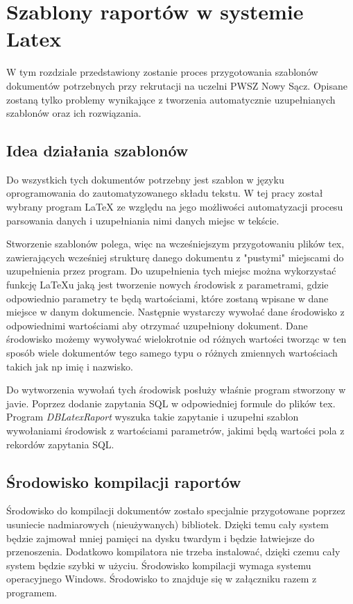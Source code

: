 \chapter{Szablony raportów w systemie Latex}
\label{ch:szablonyraportowwsystemielatex}

W tym rozdziale przedstawiony zostanie proces przygotowania szablonów dokumentów potrzebnych przy rekrutacji na uczelni PWSZ Nowy Sącz. Opisane zostaną tylko problemy wynikające z tworzenia automatycznie uzupełnianych szablonów oraz ich rozwiązania.

\section{Idea działania szablonów}

Do wszystkich tych dokumentów potrzebny jest szablon w języku oprogramowania do zautomatyzowanego składu tekstu. W tej pracy został wybrany program LaTeX ze względu na jego możliwości automatyzacji procesu parsowania danych i uzupełniania nimi danych miejsc w tekście.
\par Stworzenie szablonów polega, więc na wcześniejszym przygotowaniu plików tex, zawierających wcześniej strukturę danego dokumentu z "pustymi" miejscami do uzupełnienia przez program. Do uzupełnienia tych miejsc można wykorzystać funkcję LaTeXu jaką jest tworzenie nowych środowisk z parametrami, gdzie odpowiednio parametry te będą wartościami, które zostaną wpisane w dane miejsce w danym dokumencie. Następnie wystarczy wywołać dane środowisko z odpowiednimi wartościami aby otrzymać uzupełniony dokument. Dane środowisko możemy wywoływać wielokrotnie od różnych wartości tworząc w ten sposób wiele dokumentów tego samego typu o różnych zmiennych wartościach takich jak np imię i nazwisko. 
\par Do wytworzenia wywołań tych środowisk posłuży właśnie program stworzony w javie. Poprzez dodanie zapytania SQL w odpowiedniej formule do plików tex. Program \emph{DBLatexRaport} wyszuka takie zapytanie i uzupełni szablon wywołaniami środowisk z wartościami parametrów, jakimi będą wartości pola z rekordów zapytania SQL. 

\section{Środowisko kompilacji raportów}

Środowisko do kompilacji dokumentów zostało specjalnie przygotowane poprzez usuniecie nadmiarowych (nieużywanych) bibliotek. Dzięki temu cały system będzie zajmował mniej pamięci na dysku twardym i będzie łatwiejsze do przenoszenia. Dodatkowo kompilatora nie trzeba instalować, dzięki czemu cały system będzie szybki w użyciu. Środowisko kompilacji wymaga systemu operacyjnego Windows. Środowisko to znajduje się w załączniku razem z programem.



